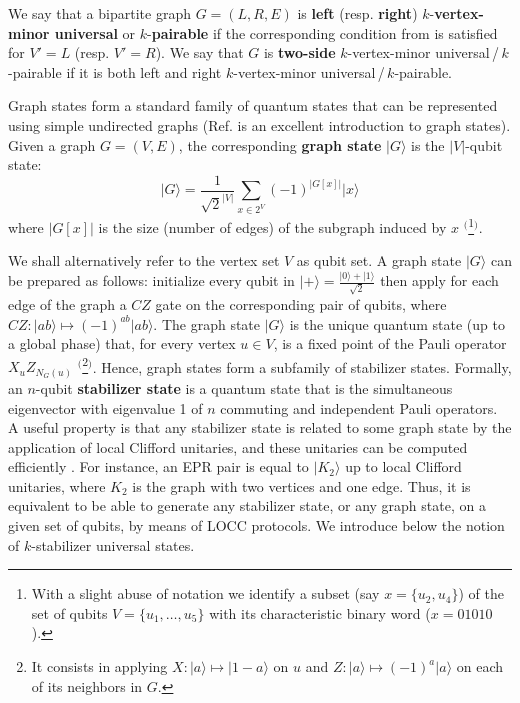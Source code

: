 \documentclass[a4paper,UKenglish,cleveref, autoref, thm-restate]{arxiv}
\newcommand{\ket}[1]{{\ensuremath{\lvert#1\rangle}}}
\begin{document}
\begin{definition} \label{def:bipartite-kvmu-kpair}
    We say that a bipartite graph $G = (L, R, E)$ is \textbf{left} (resp. \textbf{right}) $k$-\textbf{vertex-minor universal} or $k$-\textbf{pairable} if the corresponding condition from  is satisfied for $V' = L$ (resp. $V' = R$). We say that $G$ is \textbf{two-side} $k$-vertex-minor universal\,/\,$k$-pairable if it is both left and right $k$-vertex-minor universal\,/\,$k$-pairable.
\end{definition}

Graph states form a standard family of quantum states that can be represented using simple undirected graphs (Ref. \cite{Hein06} is an excellent introduction to graph states). Given a graph $G=(V,E)$, the corresponding \textbf{graph state} $\ket G$ is the $|V|$-qubit state: $$\ket G=\frac{1}{\sqrt 2^{|V|}}\sum_{x\in 2^V} (-1)^{|G[x]|}\ket x$$ where $|G[x]|$ is the size (number of edges) of the subgraph induced by $x$ $^($\footnote{With a slight abuse of notation we identify a subset (say $x=\{u_2,u_4\}$) of the set of qubits $V=\{u_1,\ldots ,u_5\}$ with its characteristic binary word  ($x=01010$).}$^)$. 

We shall alternatively refer to the vertex set $V$ as qubit set. A graph state $\ket G$ can be prepared as follows: initialize every qubit in  $\ket + = \frac{\ket 0+\ket 1}{\sqrt 2}$ then apply for each edge of the graph a $CZ$ gate on the corresponding pair of qubits, where  $CZ: \ket{ab}\mapsto (-1)^{ab}\ket{ab}$. The graph state $\ket G$ is the unique quantum state (up to a global phase) that, for every vertex $u\in V$, is a fixed point of the Pauli operator $X_uZ_{N_G(u)}$ $^($\footnote{It consists in applying $X:\ket a\mapsto \ket {1{-}a}$ on $u$ and $Z:\ket a \mapsto (-1)^a\ket a$ on each of its neighbors in $G$.}$^)$. Hence, graph states form a subfamily of stabilizer states. Formally, an $n$-qubit \textbf{stabilizer state} \cite{gottesman1998heisenberg} is a quantum state that is the simultaneous eigenvector with eigenvalue 1 of $n$ commuting and independent Pauli operators. A useful property is that any stabilizer state is related to some graph state by the application of local Clifford unitaries, and these unitaries can be computed efficiently \cite{VandenNest04}. For instance, an EPR pair is equal to $\ket{K_2}$ up to local Clifford unitaries, where $K_2$ is the graph with two vertices and one edge. Thus, it is equivalent to be able to generate any stabilizer state, or any graph state, on a given set of qubits, by means of LOCC protocols. We introduce below the notion of $k$-stabilizer universal states. 
\end{document}
